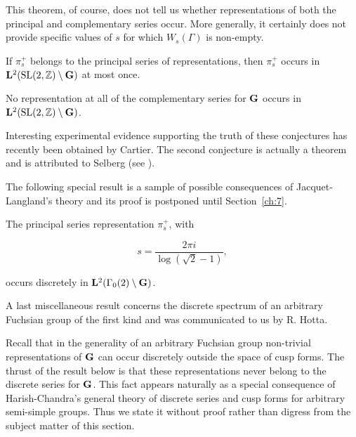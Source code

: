 This theorem, of course, does not tell us whether representations of both the principal and complementary series occur. More generally, it certainly does not provide specific values of $s$ for which $W_s(\Gamma)$ is non-empty.

\begin{conjecture}\label{conj:2.12}

If $\pi_s^{+}$ belongs to the principal series of representations, then $\pi_s^{+}$ occurs in $\mathbf{L}^2(\operatorname{SL}(2,\mathbb{Z}) \setminus \mathbf{G})$ at most once.

\end{conjecture}

\begin{conjecture}\label{conj:2.13}

No representation at all of the complementary series for $\mathbf{G}$ occurs in $\mathbf{L}^2(\operatorname{SL}(2,\mathbb{Z}) \setminus \mathbf{G})$.

\end{conjecture}

Interesting experimental evidence supporting the truth of these conjectures has recently been obtained by Cartier. The second conjecture is actually a theorem and is attributed to Selberg (see \cite{Roelcke}).

The following special result is a sample of possible consequences of Jacquet-Langland's theory and its proof is postponed until Section~\ref{ch:7}.

\begin{theorem}\label{thm:2.14}

The principal series representation $\pi_s^{+}$, with

\[
s = \frac{2\pi i}{\log(\sqrt{2} - 1)},
\]

occurs discretely in $\mathbf{L}^2(\Gamma_0(2) \setminus \mathbf{G})$.

\end{theorem}

A last miscellaneous result concerns the discrete spectrum of an arbitrary Fuchsian group of the first kind and was communicated to us by R. Hotta.

Recall that in the generality of an arbitrary Fuchsian group non-trivial representations of $\mathbf{G}$ can occur discretely outside the space of cusp forms. The thrust of the result below is that these representations never belong to the discrete series for $\mathbf{G}$. This fact appears naturally as a special consequence of Harish-Chandra's general theory of discrete series and cusp forms for arbitrary semi-simple groups. Thus we state it without proof rather than digress from the subject matter of this section.

